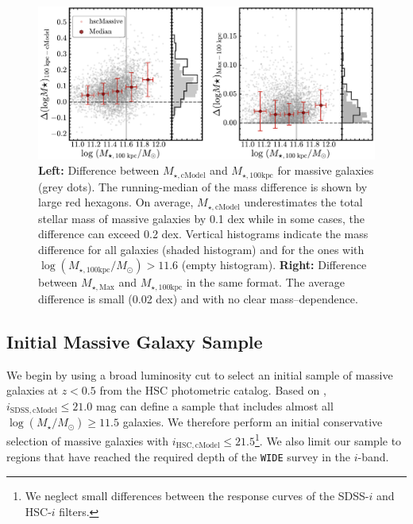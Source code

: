 \documentclass[a4paper,fleqn,usenatbib]{mnras}
\def\logms{{$\log (M_{\star}/M_{\odot})$}}
\def\mtot{{$M_{\star,100\mathrm{kpc}}$}}
\def\mmax{{$M_{\star,\mathrm{Max}}$}}
\def\mcmodel{{$M_{\star,\mathrm{cModel}}$}}
\def\logmtot{{$\log (M_{\star,100\mathrm{kpc}}/M_{\odot})$}}
\begin{document}
  \begin{figure}
      \centering 
      \includegraphics[width=\textwidth]{fig/redbcg_mass_diff_new}
      \caption{              
          \textbf{Left:} Difference between \mcmodel{} and \mtot{} for massive
      	  galaxies (grey dots).
      	  The running-median of the mass difference is shown by large red hexagons. On average, \mcmodel{} underestimates the total stellar mass of massive 
          galaxies by 0.1 dex while in some cases, the difference can exceed 0.2 dex.
          Vertical histograms indicate the mass difference for all galaxies (shaded 
          histogram) and for the ones with \logmtot{}$>11.6$ (empty histogram).
          \textbf{Right:} Difference between \mmax{} and \mtot{} in the same format. 
          The average difference is small (0.02 dex) and with no clear mass--dependence. }
      \label{fig:mass_diff}
  \end{figure}
          
    
\subsection{Initial Massive Galaxy Sample}
    \label{ssec:initial}
    
    We begin by using a broad luminosity cut to select an initial sample of massive 
    galaxies at $z < 0.5$ from the HSC photometric catalog. 
    Based on \citet{Leauthaud2016}, $i_{\mathrm{SDSS, cModel}} \leq 21.0$ mag can 
    define a sample that includes almost all \logms{}$\geq 11.5$ galaxies.    
    We therefore perform an initial conservative selection of massive galaxies
    with $i_{\mathrm{HSC, cModel}} \leq 21.5$\footnote{We neglect small differences
    between the response curves of the SDSS-$i$ and HSC-$i$ filters.}. We also limit our sample to regions that have reached the required depth of 
    the \texttt{WIDE} survey in the $i$-band.
    
\end{document}
